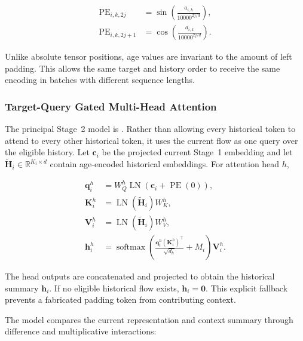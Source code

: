 \begin{align}
    \operatorname{PE}_{i,k,2j}
    &=\sin\left(
        \frac{a_{i,k}}{10000^{2j/d}}
      \right),\\
    \operatorname{PE}_{i,k,2j+1}
    &=\cos\left(
        \frac{a_{i,k}}{10000^{2j/d}}
      \right).
    \label{eq:stage2_age_encoding}
\end{align}

Unlike absolute tensor positions, age values are invariant to the amount of
left padding. This allows the same target and history order to receive the same
encoding in batches with different sequence lengths.

\subsubsection{Target-Query Gated Multi-Head Attention}
\label{subsubsec:target_query_attention}

The principal Stage~2 model is
. Rather than allowing every historical token
to attend to every other historical token, it uses the current flow as one
query over the eligible history. Let $\mathbf{c}_i$ be the projected current
Stage~1 embedding and let
$\widetilde{\mathbf{H}}_i\in\mathbb{R}^{K_i\times d}$ contain age-encoded
historical embeddings. For attention head $h$,

\begin{align}
    \mathbf{q}^{h}_i
    &=W_Q^{h}\operatorname{LN}
      \left(\mathbf{c}_i+\operatorname{PE}(0)\right),\\
    \mathbf{K}^{h}_i
    &=\operatorname{LN}(\widetilde{\mathbf{H}}_i)W_K^{h},\\
    \mathbf{V}^{h}_i
    &=\operatorname{LN}(\widetilde{\mathbf{H}}_i)W_V^{h},\\
    \mathbf{h}^{h}_i
    &=\operatorname{softmax}
      \left(
        \frac{\mathbf{q}^{h}_i(\mathbf{K}^{h}_i)^{\top}}
             {\sqrt{d_h}}+M_i
      \right)
      \mathbf{V}^{h}_i.
    \label{eq:target_query_attention}
\end{align}

The head outputs are concatenated and projected to obtain the historical
summary $\mathbf{h}_i$. If no eligible historical flow exists,
$\mathbf{h}_i=\mathbf{0}$. This explicit fallback prevents a fabricated
padding token from contributing context.

The model compares the current representation and context summary through
difference and multiplicative interactions:

